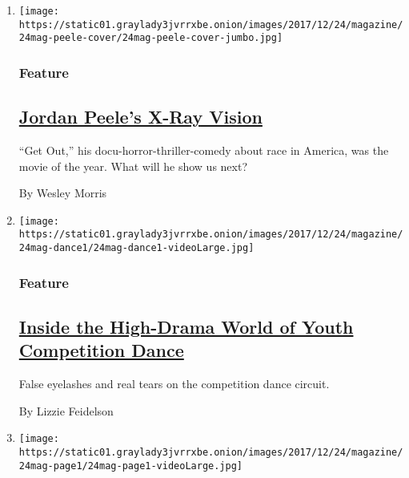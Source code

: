 \begin{enumerate}
\def\labelenumi{\arabic{enumi}.}
\item
  \texttt{[image: https://static01.graylady3jvrrxbe.onion/images/2017/12/24/magazine/24mag-peele-cover/24mag-peele-cover-jumbo.jpg]}

  \hypertarget{feature}{%
  \subsubsection{Feature}\label{feature}}

  \hypertarget{jordan-peeles-x-ray-vision}{%
  \subsection{\texorpdfstring{\href{/2017/12/20/magazine/jordan-peeles-x-ray-vision.html}{Jordan
  Peele's X-Ray
  Vision}}{Jordan Peele's X-Ray Vision}}\label{jordan-peeles-x-ray-vision}}

  ``Get Out,'' his docu-horror-thriller-comedy about race in America,
  was the movie of the year. What will he show us next?

  By Wesley Morris
\item
  \texttt{[image: https://static01.graylady3jvrrxbe.onion/images/2017/12/24/magazine/24mag-dance1/24mag-dance1-videoLarge.jpg]}

  \hypertarget{feature-1}{%
  \subsubsection{Feature}\label{feature-1}}

  \hypertarget{inside-the-high-drama-world-of-youth-competition-dance}{%
  \subsection{\texorpdfstring{\href{/2017/12/21/magazine/inside-the-high-drama-world-of-youth-competition-dance.html}{Inside
  the High-Drama World of Youth Competition
  Dance}}{Inside the High-Drama World of Youth Competition Dance}}\label{inside-the-high-drama-world-of-youth-competition-dance}}

  False eyelashes and real tears on the competition dance circuit.

  By Lizzie Feidelson
\item
  \texttt{[image: https://static01.graylady3jvrrxbe.onion/images/2017/12/24/magazine/24mag-page1/24mag-page1-videoLarge.jpg]}


\end{enumerate}

